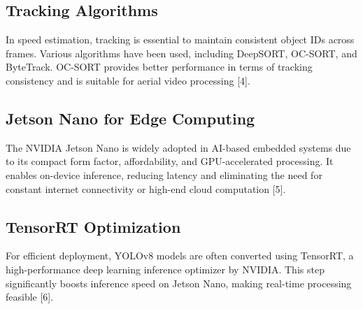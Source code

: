 \subsection{Tracking Algorithms}
In speed estimation, tracking is essential to maintain consistent object IDs across frames. Various algorithms have been used, including DeepSORT, OC-SORT, and ByteTrack. OC-SORT provides better performance in terms of tracking consistency and is suitable for aerial video processing [4].

\subsection{Jetson Nano for Edge Computing}
The NVIDIA Jetson Nano is widely adopted in AI-based embedded systems due to its compact form factor, affordability, and GPU-accelerated processing. It enables on-device inference, reducing latency and eliminating the need for constant internet connectivity or high-end cloud computation [5].

\subsection{TensorRT Optimization}
For efficient deployment, YOLOv8 models are often converted using TensorRT, a high-performance deep learning inference optimizer by NVIDIA. This step significantly boosts inference speed on Jetson Nano, making real-time processing feasible [6].
